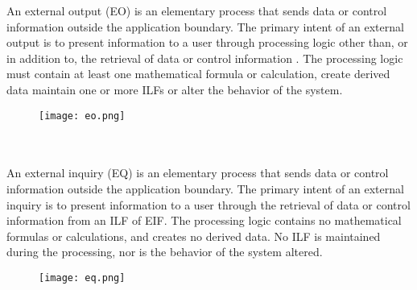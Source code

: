 \documentclass[12pt, oneside]{book}   	%
\begin{document}
An external output (EO) is an elementary process that sends data or control information outside the application boundary. The primary intent of an external output is to present information to a user through processing logic other than, or in addition to, the retrieval of data or control information . The processing logic must contain at least one mathematical formula or calculation, create derived data maintain one or more ILFs or alter the behavior of the system. 
\begin{figure}[h]
\centering
\texttt{[image: eo.png]}
\end{figure}
\\ \\
An external inquiry (EQ) is an elementary process that sends data or control information outside the application boundary. The primary intent of an external inquiry is to present information to a user through the retrieval of data or control information from an ILF of EIF. The processing logic contains no mathematical formulas or calculations, and creates no derived data. No ILF is maintained during the processing, nor is the behavior of the system altered.
\begin{figure}[h]
\centering
\texttt{[image: eq.png]}
\end{figure}
\end{document}

